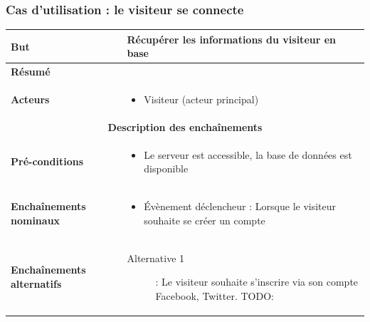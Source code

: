 \documentclass[a4paper,12pt]{report}
\begin{document}
\begin{onehalfspace}
\begin{tabular}{|p{3cm}|p{}|}
\end{tabular}


\subsubsection{Cas d'utilisation : le visiteur se connecte} %

\begin{tabular}{|p{3cm}|p{}|}
\hline %

\textbf{But} &
Récupérer les informations du visiteur en base 
\\ \hline %

\textbf{Résumé} &
\\ \hline %

\textbf{Acteurs} &
\begin{itemize}
  \item Visiteur (acteur principal)
\end{itemize} 
\\ \hline %

\multicolumn{2}{|c|}{\textbf{Description des enchaînements}}
\\ \hline %

\textbf{Pré-conditions} &
    \begin{itemize}
      \item Le serveur est accessible, la base de données est disponible    
    \end{itemize}
\\ \hline %

\textbf{Enchaînements nominaux} &
    \begin{itemize}
      \item Évènement déclencheur : Lorsque le visiteur souhaite se créer un compte
    \end{itemize}
\\ \hline %

\textbf{Enchaînements alternatifs} &
    \begin{description}
      \item[Alternative 1]: Le visiteur souhaite s’inscrire via son compte Facebook, Twitter. TODO:
    \end{description}
\\ \hline %


\end{tabular}
\end{onehalfspace}
\end{document}
